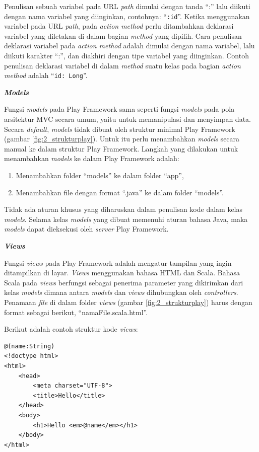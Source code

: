 \documentclass[a4paper,twoside]{article}
\begin{document}
\begin{enumerate}
\begin{itemize}
Penulisan sebuah variabel pada URL \textit{path} dimulai dengan tanda ``:'' lalu diikuti dengan nama variabel yang diinginkan, contohnya: ``\texttt{:id}''. Ketika menggunakan variabel pada URL \textit{path}, pada \textit{action method} perlu ditambahkan deklarasi variabel yang diletakan di dalam bagian \textit{method} yang dipilih. Cara penulisan deklarasi variabel pada \textit{action method} adalah dimulai dengan nama variabel, lalu diikuti karakter ``:'', dan diakhiri dengan tipe variabel yang diinginkan. Contoh penulisan deklarasi variabel di dalam \textit{method} suatu kelas pada bagian \textit{action method} adalah ``\texttt{id: Long}''. 

\textbf{\textit{Models}}

Fungsi \textit{models} pada Play Framework sama seperti fungsi \textit{models} pada pola arsitektur MVC secara umum, yaitu untuk memanipulasi dan menyimpan data. Secara \textit{default}, \textit{models} tidak dibuat oleh struktur minimal Play Framework (gambar \ref{fig:2_strukturplay}). Untuk itu perlu menambahkan \textit{models} secara manual ke dalam struktur Play Framework. Langkah yang dilakukan untuk menambahkan \textit{models} ke dalam Play Framework adalah:
\begin{enumerate}
	\item Menambahkan folder ``models'' ke dalam folder ``app'',
	\item Menambahkan file dengan format ``.java'' ke dalam folder ``models''.
\end{enumerate}

Tidak ada aturan khusus yang diharuskan dalam penulisan kode dalam kelas \textit{models}. Selama kelas \textit{models} yang dibuat memenuhi aturan bahasa Java, maka \textit{models} dapat dieksekusi oleh \textit{server} Play Framework.

\textbf{\textit{Views}}

Fungsi \textit{views} pada Play Framework adalah mengatur tampilan yang ingin ditampilkan di layar. \textit{Views} menggunakan bahasa HTML dan Scala. Bahasa Scala pada \textit{views} berfungsi sebagai penerima parameter yang dikirimkan dari kelas \textit{models} dimana antara \textit{models} dan \textit{views} dihubungkan oleh \textit{controllers}. Penamaan \textit{file} di dalam folder \textit{views} (gambar \ref{fig:2_strukturplay}) harus dengan format sebagai berikut, ``namaFile.scala.html''.

Berikut adalah contoh struktur kode \textit{views}:

\begin{lstlisting}
@(name:String)
<!doctype html>
<html>
	<head>
		<meta charset="UTF-8">
		<title>Hello</title>
	</head>
	<body>
		<h1>Hello <em>@name</em></h1>
	</body>
</html>
\end{lstlisting}


\end{itemize}
\end{enumerate}
\end{document}
